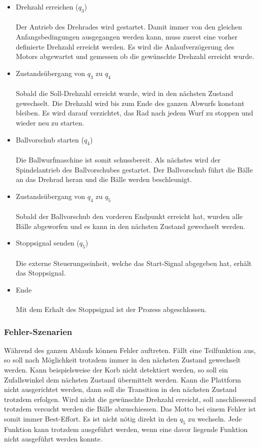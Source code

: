 \begin{itemize}
	\item Drehzahl erreichen ($q_{3}$) \\ \\
		 Der Antrieb des Drehrades wird gestartet. Damit immer von den gleichen Anfangsbedingungen ausgegangen werden kann, muss zuerst eine vorher definierte Drehzahl erreicht werden. Es wird die Anlaufverzögerung des Motors abgewartet und gemessen ob die gewünschte Drehzahl erreicht wurde.
	
	\item Zustandsübergang von $q_{3}$ zu $q_{4}$ \\ \\
		Sobald die Soll-Drehzahl erreicht wurde, wird in den nächsten Zustand gewechselt. Die Drehzahl wird bis zum Ende des ganzen Abwurfs konstant bleiben. Es wird darauf verzichtet, das Rad nach jedem Wurf zu stoppen und wieder neu zu starten.
		  
	\item Ballvorschub starten ($q_{4}$) \\ \\
		 Die Ballwurfmaschine ist somit schussbereit. Als nächstes wird der Spindelantrieb des Ballvorschubes gestartet. Der Ballvorschub führt die Bälle an das Drehrad heran und die Bälle werden beschleunigt. 
		  
	\item Zustandsübergang von $q_{4}$ zu $q_{5}$ \\ \\
		Sobald der Ballvorschub den vorderen Endpunkt erreicht hat, wurden alle Bälle abgeworfen und es kann in den nächsten Zustand gewechselt werden.
		  
	\item Stoppsignal senden ($q_{5}$) \\ \\
		Die externe Steuerungseinheit, welche das Start-Signal abgegeben hat, erhält das Stoppsignal.
		  
	\item Ende \\ \\
		Mit dem Erhalt des Stoppsignal ist der Prozess abgeschlossen.
		  
\end{itemize}

\subsubsection{Fehler-Szenarien}
Während des ganzen Ablaufs können Fehler auftreten. Fällt eine Teilfunktion aus, so soll nach Möglichkeit trotzdem immer in den nächsten Zustand gewechselt werden. Kann beispielsweise der Korb nicht detektiert werden, so soll ein Zufallswinkel dem nächsten Zustand übermittelt werden. Kann die Plattform nicht ausgerichtet werden, dann soll die Transition in den nächsten Zustand trotzdem erfolgen. Wird nicht die gewünschte Drehzahl erreicht, soll anschliessend trotzdem versucht werden die Bälle abzuschiessen. Das Motto bei einem Fehler ist somit immer Best-Effort. Es ist nicht nötig direkt in den $q_{5}$ zu wechseln. Jede Funktion kann trotzdem ausgeführt werden, wenn eine davor liegende Funktion nicht ausgeführt werden konnte.